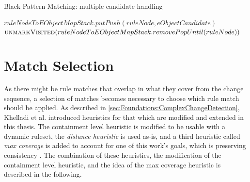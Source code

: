 \begin{algorithm}
    \caption{Black Pattern Matching: multiple candidate handling}
    \label{alg:BackwardConversionPM:BlackMatching:MultipleCandidateHandling}
    \begin{algorithmic}
                \State {}
            \EndIf
            
                \State $ruleNodeToEObjectMapStack.putPush(ruleNode, eObjectCandidate)$
                    \State {}
                \EndIf
                \State $ $
                \State $\Call{unmarkVisited}{ruleNodeToEObjectMapStack.removePopUntil(ruleNode)}$
            \EndFor
            \State {}
        \EndFunction
    \end{algorithmic}    
\end{algorithm}


\section{Match Selection}
\label{sec:Concept:PatternSelection}

As there might be rule matches that overlap in what they cover from the change sequence, a selection of matches becomes necessary to choose which rule match should be applied. As described in \autoref{sec:Foundations:ComplexChangeDetection}, Khelladi et al. \cite{khelladi_detecting_complex_changes_2015} introduced heuristics for that which are modified and extended in this thesis. 
The containment level heuristic is modified to be usable with a dynamic ruleset, the \emph{distance heuristic} is used as-is, and a third heuristic called \emph{max coverage} is added to account for one of this work's goals, which is preserving consistency .
The combination of these heuristics, the modification of the containment level heuristic, and the idea of the max coverage heuristic is described in the following.

